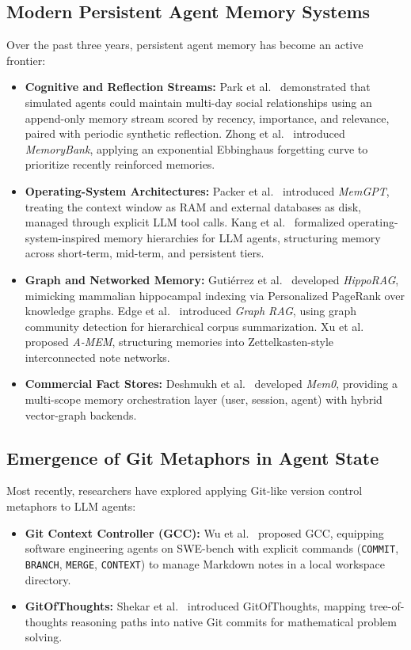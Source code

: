 \subsection{Modern Persistent Agent Memory Systems}
Over the past three years, persistent agent memory has become an active frontier:
\begin{itemize}
    \item \textbf{Cognitive and Reflection Streams:} Park et al.~\cite{park2023generative} demonstrated that simulated agents could maintain multi-day social relationships using an append-only memory stream scored by recency, importance, and relevance, paired with periodic synthetic reflection. Zhong et al.~\cite{zhong2023memorybank} introduced \textit{MemoryBank}, applying an exponential Ebbinghaus forgetting curve to prioritize recently reinforced memories.
    \item \textbf{Operating-System Architectures:} Packer et al.~\cite{packer2023memgpt} introduced \textit{MemGPT}, treating the context window as RAM and external databases as disk, managed through explicit LLM tool calls. Kang et al.~\cite{kang2025memoryos} formalized operating-system-inspired memory hierarchies for LLM agents, structuring memory across short-term, mid-term, and persistent tiers.
    \item \textbf{Graph and Networked Memory:} Guti{\'e}rrez et al.~\cite{gutierrez2024hipporag} developed \textit{HippoRAG}, mimicking mammalian hippocampal indexing via Personalized PageRank over knowledge graphs. Edge et al.~\cite{edge2024graphrag} introduced \textit{Graph RAG}, using graph community detection for hierarchical corpus summarization. Xu et al.~\cite{xu2024amem} proposed \textit{A-MEM}, structuring memories into Zettelkasten-style interconnected note networks.
    \item \textbf{Commercial Fact Stores:} Deshmukh et al.~\cite{deshmukh2024mem0} developed \textit{Mem0}, providing a multi-scope memory orchestration layer (user, session, agent) with hybrid vector-graph backends.
\end{itemize}

\subsection{Emergence of Git Metaphors in Agent State}
Most recently, researchers have explored applying Git-like version control metaphors to LLM agents:
\begin{itemize}
    \item \textbf{Git Context Controller (GCC):} Wu et al.~\cite{wu2025gcc} proposed GCC, equipping software engineering agents on SWE-bench with explicit commands (\texttt{COMMIT}, \texttt{BRANCH}, \texttt{MERGE}, \texttt{CONTEXT}) to manage Markdown notes in a local workspace directory.
    \item \textbf{GitOfThoughts:} Shekar et al.~\cite{shekar2025gitofthoughts} introduced GitOfThoughts, mapping tree-of-thoughts reasoning paths into native Git commits for mathematical problem solving.
\end{itemize}

